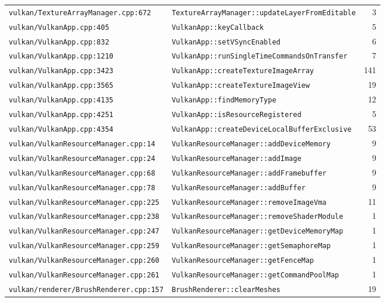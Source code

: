 \documentclass[11pt,a4paper]{article}
\begin{document}
{\begin{longtable}{L{0.40\textwidth} L{0.48\textwidth} r}
\texttt{vulkan/TextureArrayManager.cpp:672} & \texttt{TextureArrayManager::updateLayerFromEditable} & 3 \\
\texttt{vulkan/VulkanApp.cpp:405} & \texttt{VulkanApp::keyCallback} & 5 \\
\texttt{vulkan/VulkanApp.cpp:832} & \texttt{VulkanApp::setVSyncEnabled} & 6 \\
\texttt{vulkan/VulkanApp.cpp:1210} & \texttt{VulkanApp::runSingleTimeCommandsOnTransfer} & 7 \\
\texttt{vulkan/VulkanApp.cpp:3423} & \texttt{VulkanApp::createTextureImageArray} & 141 \\
\texttt{vulkan/VulkanApp.cpp:3565} & \texttt{VulkanApp::createTextureImageView} & 19 \\
\texttt{vulkan/VulkanApp.cpp:4135} & \texttt{VulkanApp::findMemoryType} & 12 \\
\texttt{vulkan/VulkanApp.cpp:4251} & \texttt{VulkanApp::isResourceRegistered} & 5 \\
\texttt{vulkan/VulkanApp.cpp:4354} & \texttt{VulkanApp::createDeviceLocalBufferExclusive} & 53 \\
\texttt{vulkan/VulkanResourceManager.cpp:14} & \texttt{VulkanResourceManager::addDeviceMemory} & 9 \\
\texttt{vulkan/VulkanResourceManager.cpp:24} & \texttt{VulkanResourceManager::addImage} & 9 \\
\texttt{vulkan/VulkanResourceManager.cpp:68} & \texttt{VulkanResourceManager::addFramebuffer} & 9 \\
\texttt{vulkan/VulkanResourceManager.cpp:78} & \texttt{VulkanResourceManager::addBuffer} & 9 \\
\texttt{vulkan/VulkanResourceManager.cpp:225} & \texttt{VulkanResourceManager::removeImageVma} & 11 \\
\texttt{vulkan/VulkanResourceManager.cpp:238} & \texttt{VulkanResourceManager::removeShaderModule} & 1 \\
\texttt{vulkan/VulkanResourceManager.cpp:247} & \texttt{VulkanResourceManager::getDeviceMemoryMap} & 1 \\
\texttt{vulkan/VulkanResourceManager.cpp:259} & \texttt{VulkanResourceManager::getSemaphoreMap} & 1 \\
\texttt{vulkan/VulkanResourceManager.cpp:260} & \texttt{VulkanResourceManager::getFenceMap} & 1 \\
\texttt{vulkan/VulkanResourceManager.cpp:261} & \texttt{VulkanResourceManager::getCommandPoolMap} & 1 \\
\texttt{vulkan/renderer/BrushRenderer.cpp:157} & \texttt{BrushRenderer::clearMeshes} & 19 \\

\end{longtable}}
\end{document}
